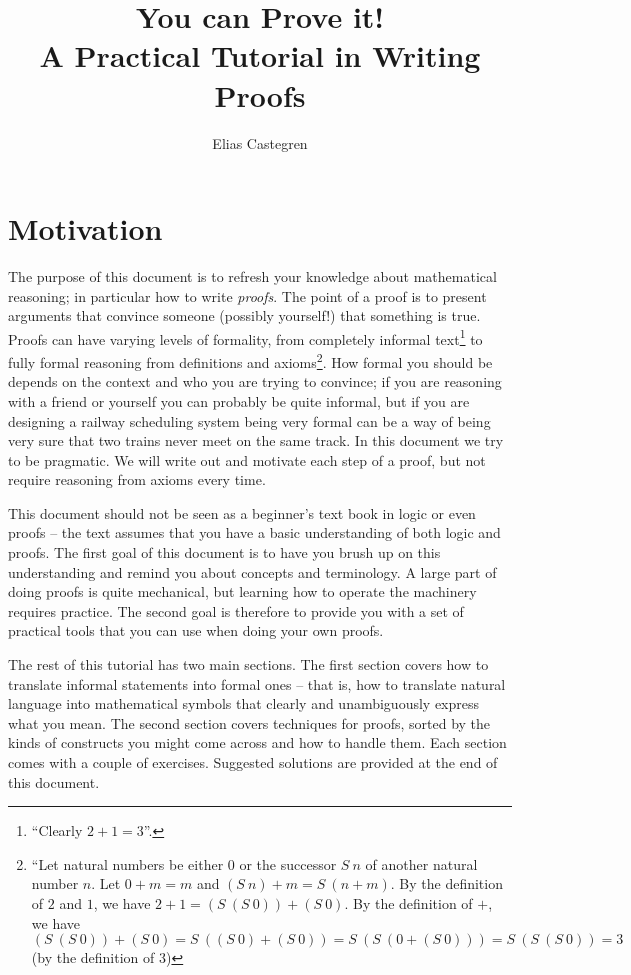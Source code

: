 \documentclass{tufte-handout}
\title[You can Prove it!]{You can Prove it!\\
{\large A Practical Tutorial in Writing Proofs}}
\author{Elias Castegren}
\begin{document}
\maketitle


\section{Motivation}

The purpose of this document is to refresh your knowledge about
mathematical reasoning; in particular how to write \emph{proofs}.
%
The point of a proof is to present arguments that convince someone
(possibly yourself!) that something is true.
%
Proofs can have varying levels of formality, from completely
informal text\footnote{``Clearly $2 + 1 = 3$''.} to fully formal
reasoning from definitions and axioms\footnote{``Let natural
  numbers be either 0 or the successor $S~n$ of another natural
  number $n$. Let $0 + m = m$ and $(S~n)+m = S~(n+m)$. By the
  definition of $2$ and $1$, we have $2 + 1 = (S~(S~0)) + (S~0)$.
  By the definition of $+$, we have
  $(S~(S~0)) + (S~0) = S~((S~0) + (S~0)) = S~(S~(0 + (S~0))) =
  S~(S~(S~0)) = 3$ (by the definition of $3$)}.
%
How formal you should be depends on the context and who you are
trying to convince; if you are reasoning with a friend or yourself
you can probably be quite informal, but if you are designing a
railway scheduling system being very formal can be a way of being
very sure that two trains never meet on the same track.
%
In this document we try to be pragmatic. We will write out and
motivate each step of a proof, but not require reasoning from
axioms every time.

This document should not be seen as a beginner's text book in
logic or even proofs -- the text assumes that you have a basic
understanding of both logic and proofs. The first goal of this
document is to have you brush up on this understanding and remind
you about concepts and terminology. A large part of doing proofs
is quite mechanical, but learning how to operate the machinery
requires practice. The second goal is therefore to provide you
with a set of practical tools that you can use when doing your own
proofs.

The rest of this tutorial has two main sections.
%
The first section covers how to translate informal statements into
formal ones -- that is, how to translate natural language into
mathematical symbols that clearly and unambiguously express what
you mean.
%
The second section covers techniques for proofs, sorted by the
kinds of constructs you might come across and how to handle them.
%
%
Each section comes with a couple of exercises. Suggested solutions
are provided at the end of this document.
\end{document}
